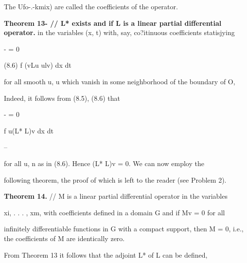\begin{ocrformula}
The     Ufo-.-kmix) are called the coefficients of the operator.
\end{ocrformula}

\medskip\noindent\textbf{Theorem 13- // L* exists and if L is a linear partial differential operator.} 
in the variables (x, t) with, say, co?itinuous coefficients statisjying

- = 0

\begin{ocrformula}
(8.6)                              f (vLu             ulv) dx dt
\end{ocrformula}

for all smooth u, u which vanish in some neighborhood of the boundary of O,

\begin{ocrformula}
then L xx L*} i.e., the coefficients of L coincide with                        the coefficients of L*.
\end{ocrformula}

\begin{ocrformula}
Indeed,     it follows from     (8.5), (8.6) that
\end{ocrformula}

- = 0

\begin{ocrformula}
f u(L*            L)v dx dt
\end{ocrformula}

--

\begin{ocrformula}
for all u, n as in (8.6). Hence  (L*   L)v = 0. We     can now employ                                 the
\end{ocrformula}

following theorem, the proof of which is left to the reader (see Problem 2).

\medskip\noindent\textbf{Theorem 14.} // M is a linear partial differential operator in the variables

\begin{ocrformula}
xi, . . . , xm, with coefficients defined in a domain    G and if Mv = 0 for all
\end{ocrformula}

infinitely differentiable functions in G with a compact support, then M = 0, i.e., the coefficients of M are identically zero.

From Theorem 13 it follows that the adjoint L* of L can be defined,

